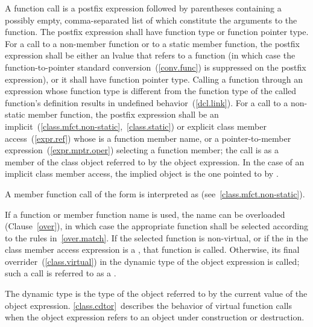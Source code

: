 \pnum
{}%
%
%
A function call is a postfix expression followed by parentheses
containing a possibly empty, comma-separated list of
 which
constitute the arguments to the function. The postfix expression shall
have function type or function pointer type.
For a call to a non-member function or to a static member function,
the postfix expression shall be either an lvalue that refers to a
function (in which case the function-to-pointer standard
conversion~(\ref{conv.func}) is suppressed on the postfix expression),
or it shall have function pointer type. Calling a function through an
expression whose function type is different
from the function type of the called function's
definition results in undefined behavior~(\ref{dcl.link}). For a call to a non-static
member function,
the postfix expression shall be an
implicit~(\ref{class.mfct.non-static},~\ref{class.static}) or explicit
class member access~(\ref{expr.ref}) whose  is a
function member name, or a pointer-to-member
expression~(\ref{expr.mptr.oper}) selecting a function member; the call is as a member of
the class object referred to by the
object expression. In the case of an implicit class
member access, the implied object is the one pointed to by .
\begin{note}
A member function call of the form  is interpreted as
 (see~\ref{class.mfct.non-static}).
\end{note}
If a function or member function name is used, the name can be
overloaded (Clause~\ref{over}), in which case the appropriate function
shall be selected according to the rules in~\ref{over.match}. If the selected
function is non-virtual, or if the  in the class
member access expression is a , that function is
called. Otherwise, its final overrider~(\ref{class.virtual}) in the dynamic type
of the object expression is called; such a call is referred to as a
.
\begin{note}
The dynamic type is the type of the object referred to by the
current value of the object expression. \ref{class.cdtor}~describes the
behavior of virtual function calls when the object expression
refers to
an object under construction or destruction.
\end{note}

